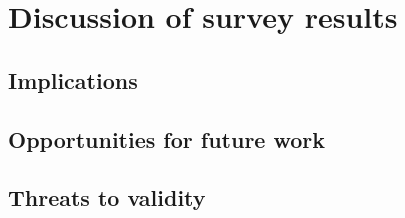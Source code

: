 \section{Discussion of survey results}
\subsection{Implications}
\subsection{Opportunities for future work}
\subsection{Threats to validity}
